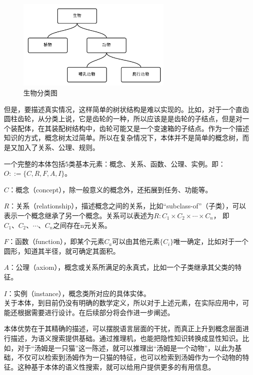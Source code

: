 \documentclass[12pt,a4paper]{article}
\newcommand{\wuhao}{\fontsize{10.5pt}{\baselineskip}\selectfont}
\begin{document}
	\begin{figure}[htbp] 
	\centering\includegraphics[width=3in]{fig/biotax.png} 
	\caption{\wuhao 生物分类图}\label{fig:生物分类} 
	\end{figure}	
	
	但是，要描述真实情况，这样简单的树状结构是难以实现的。比如，对于一个直齿圆柱齿轮，从分类上说，它是齿轮的一种，所以应该是是齿轮的子结点，但是对一个装配体，在其装配树结构中，齿轮可能又是一个变速箱的子结点。作为一个描述知识的方式，概念树太过简单。所以在复杂情况下，本体并不是简单的概念树，而是又加入了关系、公理、规则。
	
	一个完整的本体包括5类基本元素：概念、关系、函数、公理、实例。即：$O::=\{C,R,F,A,I\}$。\cite{Chen2010}
	
	$C$：概念（{\Times concept}），除一般意义的概念外，还拓展到任务、功能等。
	
	$R$：关系（{\Times relationship}），描述概念之间的关系，比如“{\Times subclass-of}”（子类），可以表示一个概念继承了另一个概念。关系可以表述为$ R:C_{1} \times C_{2} \times \cdots \times C_{n} $， 即$C_{1}、C_{2}、\cdots 、C_{n}$之间存在{\Times n}元关系。
	
	$F$：函数（{\Times function}），即某个元素$C_{a}$可以由其他元素$ \{C_{i}\} $唯一确定，比如对于一个圆形，知道其半径，就可确定其面积。
	
	$A$：公理（{\Times axiom}），概念或关系所满足的永真式，比如一个子类继承其父类的特征。
	
	$I$：实例（{\Times instance}），概念类所对应的具体实体。
	\\
	
	关于本体，到目前仍没有明确的数学定义，所以对于上述元素，在实际应用中，可能还根据需要进行设计。在后续部分将会作进一步阐述。
	
	本体优势在于其精确的描述，可以摆脱语言层面的干扰，而真正上升到概念层面进行描述，为语义搜索提供基础。通过推理机，也能把隐性知识转换成显性知识。比如，对于“汤姆是一只猫”这一陈述，就可以推理出“汤姆是一个动物”，以此为基础，不仅可以检索到汤姆作为一只猫的特征，也可以检索到汤姆作为一个动物的特征。这种基于本体的语义性搜索，就可以给用户提供更多的有用信息。
	
\end{document}
